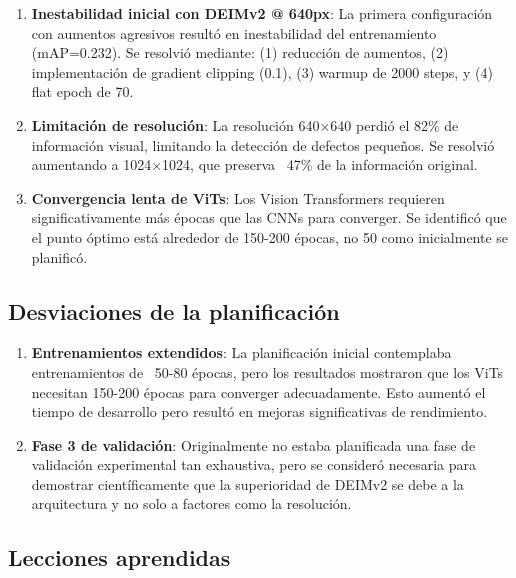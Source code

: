 \begin{enumerate}
    \item \textbf{Inestabilidad inicial con DEIMv2 @ 640px}: La primera configuración con aumentos agresivos resultó en inestabilidad del entrenamiento (mAP=0.232). Se resolvió mediante: (1) reducción de aumentos, (2) implementación de gradient clipping (0.1), (3) warmup de 2000 steps, y (4) flat epoch de 70.
    
    \item \textbf{Limitación de resolución}: La resolución 640×640 perdió el 82\% de información visual, limitando la detección de defectos pequeños. Se resolvió aumentando a 1024×1024, que preserva ~47\% de la información original.
    
    \item \textbf{Convergencia lenta de ViTs}: Los Vision Transformers requieren significativamente más épocas que las CNNs para converger. Se identificó que el punto óptimo está alrededor de 150-200 épocas, no 50 como inicialmente se planificó.
\end{enumerate}

\subsection{Desviaciones de la planificación}

\begin{enumerate}
    \item \textbf{Entrenamientos extendidos}: La planificación inicial contemplaba entrenamientos de ~50-80 épocas, pero los resultados mostraron que los ViTs necesitan 150-200 épocas para converger adecuadamente. Esto aumentó el tiempo de desarrollo pero resultó en mejoras significativas de rendimiento.
    
    \item \textbf{Fase 3 de validación}: Originalmente no estaba planificada una fase de validación experimental tan exhaustiva, pero se consideró necesaria para demostrar científicamente que la superioridad de DEIMv2 se debe a la arquitectura y no solo a factores como la resolución.
\end{enumerate}

\subsection{Lecciones aprendidas}

